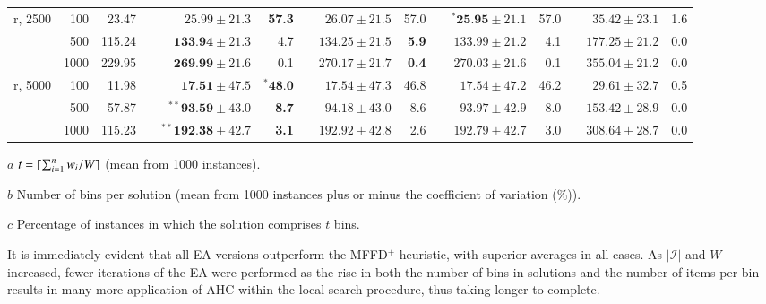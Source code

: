 \documentclass[authoryear]{elsarticle}
\begin{document}
\begin{table}[h!]
\begin{threeparttable}
\begin{tabular}{crrcrrcrrcrrcrr}
	\midrule
	\midrule
	r, 2500 & 100 & 23.47 && $25.99 \pm 21.3$ & \textbf{57.3} && $26.07 \pm 21.5$ & 57.0 && $^{*}\textbf{25.95} \pm 21.1$ & 57.0 && $35.42 \pm 23.1$ & 1.6 \\
	& 500 & 115.24 && $\textbf{133.94} \pm 21.3$ & 4.7 && $134.25 \pm 21.5$ & \textbf{5.9} && $133.99 \pm 21.2$ & 4.1 && $177.25 \pm 21.2$ & 0.0 \\
	& 1000 & 229.95 && $\textbf{269.99} \pm 21.6$ & 0.1 && $270.17 \pm 21.7$ & \textbf{0.4} && $270.03 \pm 21.6$ & 0.1 && $355.04 \pm 21.2$ & 0.0 \\
	\midrule
	r, 5000 & 100 & 11.98 && $\textbf{17.51} \pm 47.5$ & $^{*}\textbf{48.0}$ && $17.54 \pm 47.3$ & 46.8 && $17.54 \pm 47.2$ & 46.2 && $29.61 \pm 32.7$ & 0.5 \\
	& 500 & 57.87 && $^{**}\textbf{93.59} \pm 43.0$ & \textbf{8.7} && $94.18 \pm 43.0$ & 8.6 && $93.97 \pm 42.9$ & 8.0 && $153.42 \pm 28.9$ & 0.0 \\
	& 1000 & 115.23 && $^{**}\textbf{192.38} \pm 42.7$ & \textbf{3.1} && $192.92 \pm 42.8$ & 2.6 && $192.79 \pm 42.7$ & 3.0 && $308.64 \pm 28.7$ & 0.0 \\
	\bottomrule
\end{tabular}	
\vspace{0.2cm} %
\begin{tablenotes}
	\scriptsize
	\item[$a$] $t = \lceil\sum_{i=1}^{n} w_i / W\rceil$ (mean from 1000 instances).
	\item[$b$] Number of bins per solution (mean from 1000 instances plus or minus the coefficient of variation (\%)).
	\item[$c$] Percentage of instances in which the solution comprises $t$ bins.
\end{tablenotes}
\end{threeparttable}
\label{table:ea}
\end{table}

It is immediately evident that all EA versions outperform the MFFD$^+$ heuristic, with superior averages in all cases. As $|\mathcal{I}|$ and $W$ increased, fewer iterations of the EA were performed as the rise in both the number of bins in solutions and the number of items per bin results in many more application of AHC within the local search procedure, thus taking longer to complete.

\end{document}
